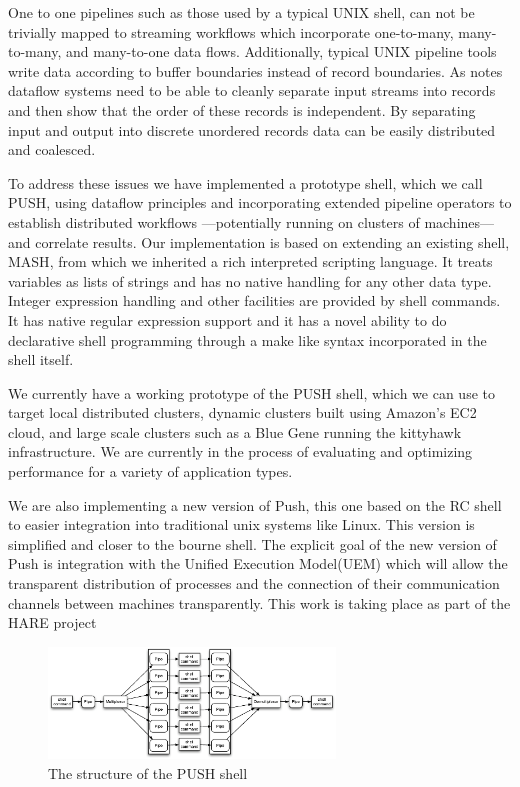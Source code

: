 \documentclass{sig-alt-release2}
\begin{document}
One to one pipelines such as those used by a typical UNIX shell,
can not be trivially mapped to streaming workflows which incorporate
one-to-many, many-to-many, and many-to-one data flows.  Additionally,
typical UNIX pipeline tools write data according to buffer boundaries
instead of record boundaries.  As \cite{pike2005idp} notes dataflow
systems need to be able to cleanly separate input streams into
records and then show that the order of these records is independent.
By separating input and output into discrete unordered records data
can be easily distributed and coalesced.

To address these issues we have implemented a prototype shell, which
we call PUSH, using dataflow principles and incorporating extended
pipeline operators to establish distributed workflows ---potentially
running on clusters of machines--- and correlate results.  Our
implementation is based on extending an existing shell, MASH\cite{mashman},
from which we inherited a rich interpreted scripting language.  It
treats variables as lists of strings and has no native handling for
any other data type.  Integer expression handling and other facilities
are provided by shell commands.  It has native regular expression
support and it has a novel ability to do declarative shell programming
through a make like syntax incorporated in the shell itself.

We currently have a working prototype of the PUSH shell, which we
can use to target local distributed clusters, dynamic clusters built
using Amazon's EC2 cloud, and large scale clusters such as a Blue
Gene running the kittyhawk infrastructure.  We are currently in the
process of evaluating and optimizing performance for a variety of
application types.


We are also implementing a new version of Push, this one based on
the RC shell\cite{rcpaper} to easier integration into traditional unix
systems like Linux. This version is simplified and closer to the
bourne shell. The explicit goal of the new version of Push is
integration with the Unified Execution Model(UEM)\cite{van-unified} which will
allow the transparent distribution of processes and the connection
of their communication channels between machines transparently.
This work is taking place as part of the HARE project\cite{van2008holistic} 


\begin{figure}[htp]
\centering
\includegraphics[width=3in]{pipestruct.eps}
\caption{The structure of the PUSH shell}
\label{fig:pipestruct} 
\end{figure}
\end{document}
